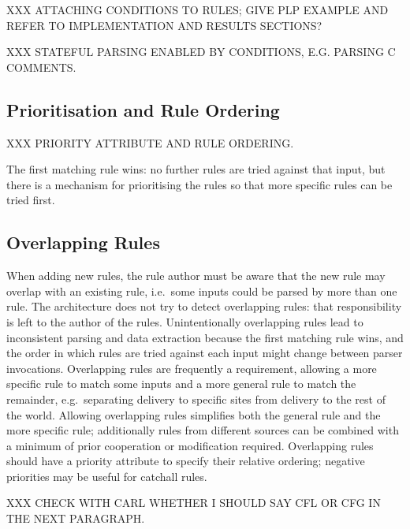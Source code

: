 XXX ATTACHING CONDITIONS TO RULES\@; GIVE PLP EXAMPLE AND REFER TO
IMPLEMENTATION AND RESULTS SECTIONS\@?

XXX STATEFUL PARSING ENABLED BY CONDITIONS, E.G\@.  PARSING C COMMENTS\@.

\subsection{Prioritisation and Rule Ordering}

XXX PRIORITY ATTRIBUTE AND RULE ORDERING\@.

The first matching rule wins: no further rules are tried against that
input, but there is a mechanism for prioritising the rules so that more
specific rules can be tried first.

\subsection{Overlapping Rules}

When adding new rules, the rule author must be aware that the new rule may
overlap with an existing rule, i.e.\ some inputs could be parsed by more
than one rule.  The architecture does not try to detect overlapping rules:
that responsibility is left to the author of the rules.  Unintentionally
overlapping rules lead to inconsistent parsing and data extraction because
the first matching rule wins, and the order in which rules are tried
against each input might change between parser invocations.  Overlapping
rules are frequently a requirement, allowing a more specific rule to match
some inputs and a more general rule to match the remainder, e.g.\
separating  delivery to specific sites from 
delivery to the rest of the world.  Allowing overlapping rules simplifies
both the general rule and the more specific rule; additionally rules from
different sources can be combined with a minimum of prior cooperation or
modification required.  Overlapping rules should have a priority attribute
to specify their relative ordering; negative priorities may be useful for
catchall rules.

XXX CHECK WITH CARL WHETHER I SHOULD SAY CFL OR CFG IN THE NEXT
PARAGRAPH\@.

